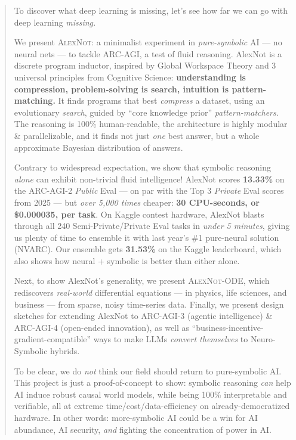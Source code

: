 \documentclass[11pt]{article}
\begin{document}
\vspace{-3em}
\begin{abstract}

To discover what deep learning is missing, let's see how far we can go with deep learning \textit{missing.}

We present \textsc{AlexNot}: a minimalist experiment in \textit{pure-symbolic} AI — no neural nets — to tackle ARC-AGI, a test of fluid reasoning. AlexNot is a discrete program inductor, inspired by Global Workspace Theory and 3 universal principles from Cognitive Science: \textbf{understanding is compression, problem-solving is search, intuition is pattern-matching.} It finds programs that best \textit{compress} a dataset, using an evolutionary \textit{search}, guided by ``core knowledge prior'' \textit{pattern-matchers}. The reasoning is 100\% human-readable, the architecture is highly modular \& parallelizable, and it finds not just \textit{one} best answer, but a whole approximate Bayesian distribution of answers.

Contrary to widespread expectation, we show that symbolic reasoning \textit{alone} can exhibit non-trivial fluid intelligence! AlexNot scores \textbf{13.33\%} on the ARC-AGI-2 \textit{Public} Eval — on par with the Top 3 \textit{Private} Eval scores from 2025 — but \textit{over 5,000 times} cheaper: \textbf{30 CPU-seconds, or \$0.000035, per task}. On Kaggle contest hardware, AlexNot blasts through all 240 Semi-Private/Private Eval tasks in \textit{under 5 minutes}, giving us plenty of time to ensemble it with last year's \#1 pure-neural solution (NVARC). Our ensemble gets \textbf{31.53\%} on the Kaggle leaderboard, which also shows how neural + symbolic is better than either alone. 

Next, to show AlexNot's generality, we present \textsc{AlexNot-ODE}, which rediscovers \textit{real-world} differential equations — in physics, life sciences, and business — from sparse, noisy time-series data. Finally, we present design sketches for extending AlexNot to ARC-AGI-3 (agentic intelligence) \& ARC-AGI-4 (open-ended innovation), as well as ``business-incentive-gradient-compatible'' ways to make LLMs \textit{convert themselves} to Neuro-Symbolic hybrids.

To be clear, we do \textit{not} think our field should return to pure-symbolic AI. This project is just a proof-of-concept to show: symbolic reasoning \textit{can} help AI induce robust causal world models, while being 100\% interpretable and verifiable, all at extreme time/cost/data-efficiency on already-democratized hardware. In other words: more-symbolic AI could be a win for AI abundance, AI security, \textit{and} fighting the concentration of power in AI.


\end{abstract}
\end{document}
